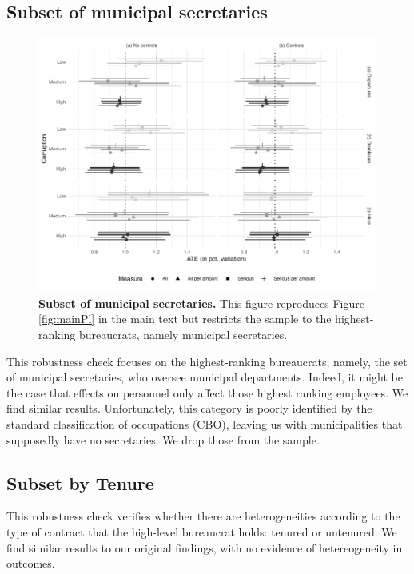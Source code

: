 {\subsection{Subset of municipal secretaries}
\label{app:secretariesRobustness}

\begin{figure}[H]
    \centering
    \includegraphics{chapters/chapter_2/figures/plSubset}
    \caption{{\bf Subset of municipal secretaries.} This figure reproduces Figure \ref{fig:mainPl} in the main text but restricts the sample to the highest-ranking bureaucrats, namely municipal secretaries.}
    \label{fig:plSubset}
\end{figure}

This robustness check focuses on the highest-ranking bureaucrats; namely, the set of municipal secretaries, who oversee municipal departments. Indeed, it might be the case that effects on personnel only affect those highest ranking employees. We find similar results. Unfortunately, this category is poorly identified by the standard classification of occupations (CBO), leaving us with municipalities that supposedly have no secretaries. We drop those from the sample. 

\subsection{Subset by Tenure}
\label{app:tenuredRobustness}

This robustness check verifies whether there are heterogeneities according to the type of contract that the high-level bureaucrat holds: tenured or untenured. We find similar results to our original findings, with no evidence of hetereogeneity in outcomes.

}
